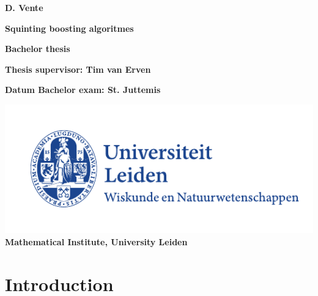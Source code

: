 \documentclass[a4paper,dutch,reqno]{article}
\theoremstyle{plain}
\theoremstyle{definition}
\begin{document}
\vspace*{7em}
\begin{center}
{\large\bf D. Vente\par} \vspace{3em} {\LARGE\bf Squinting boosting algoritmes\par} \vspace{3em} {\large\bf
Bachelor thesis\par} \vspace{1em} {\large\bf Thesis supervisor:
Tim van Erven\par} \vspace{3em} {\large\bf Datum
Bachelor exam: St. Juttemis\par}\vfill
\includegraphics{uniLogo}\\
\vspace{2em}
{\large\bf Mathematical Institute, University Leiden}
\end{center}

\thispagestyle{empty} %

\newpage
\tableofcontents
\newpage

\section{Introduction}
\label{intro}
\end{document}
